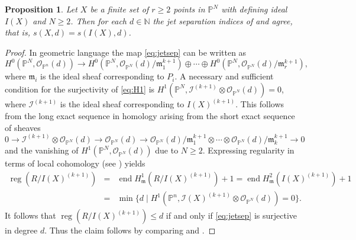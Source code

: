 \documentclass[12pt, reqno]{amsart}
\numberwithin{equation}{section}
\newcommand{\fm}{{\mathfrak m}}
\newcommand{\N}{{\mathbb N}}
\renewcommand{\P}{{\mathbb P}}
\newcommand{\I}{{\mathcal I}}
\DeclareMathOperator{\reg}{reg}
\DeclareMathOperator{\soc}{end}
\theoremstyle{plain} %
\newtheorem{prop}[thm]{Proposition}
\theoremstyle{definition}
\theoremstyle{remark}
\begin{document}
\begin{prop}
\label{prop:jet}
Let $X$ be a finite set of $r\geq 2$ points in  $\mathbb{P}^N$ with defining ideal $I(X)$ and $N\geq 2$. Then for each $d\in\N$ the jet separation indices of  and  agree, that is,  $s(X,d)= s(I(X),d)$.
\end{prop}
\begin{proof}
In geometric language the map \eqref{eq:jetsep} can be written as
\begin{equation}
\label{eq:H1}
H^0(\P^N, \mathcal{O}_{\P^n}(d) )\to H^0(\P^N,    \mathcal{O}_{\P^N}(d)/\fm_1^{k+1}) \oplus \cdots \oplus  H^0(\P^N,  \mathcal{O}_{\P^N}(d)/\fm_r^{k+1}),
\end{equation}
where $\fm_i$ is the ideal sheaf corresponding to $P_i$.
A necessary and sufficient condition for the surjectivity of \eqref{eq:H1} is
 $H^1(\P^N,  \I^{(k+1)}\otimes \mathcal{O}_{\P^N}(d))=0$, where $\I^{(k+1)}$ is the ideal sheaf corresponding to $I(X)^{(k+1)}$. 
This follows from the long exact sequence in homology arising from the short exact sequence of sheaves
\[
0\to  \I^{(k+1)}\otimes \mathcal{O}_{\P^N}(d) \to \mathcal{O}_{\P^N}(d) \to \mathcal{O}_{\P^N}(d)/\fm_1^{k+1}\otimes \cdots \otimes \mathcal{O}_{\P^N}(d)/\fm_k^{k+1} \to 0
\]
and the vanishing of $H^1(\P^N, \mathcal{O}_{\P^N}(d))$ due to $N\geq 2$.
Expressing regularity in terms of local cohomology (see ) yields
\begin{eqnarray*}
\reg(R/I(X)^{(k+1)}) &=& \soc H^1_\fm(R/I(X)^{(k+1)})+1= \soc H^2_\fm(I(X)^{(k+1)})+1\\
           &=& \min\{d \mid H^1(\P^n,  \I(X)^{(k+1)}\otimes \mathcal{O}_{\P^N}(d))=0\}.
\end{eqnarray*}
It follows that $\reg(R/I(X)^{(k+1)})\leq d$ if and only if  \eqref{eq:jetsep} is surjective in degree  $d$. Thus the claim follows by comparing  and .
\end{proof}
\end{document}
